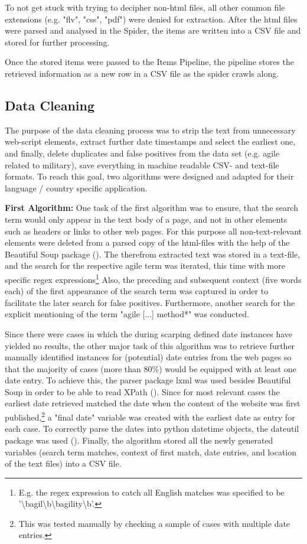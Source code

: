 \noindent
To not get stuck with trying to decipher non-html files, all other common file extensions (e.g. "flv", "css", "pdf") were denied for extraction. After the html files were parsed and analysed in the Spider, the items are written into a CSV file and stored for further processing.\par
\noindent
Once the stored items were passed to the Items Pipeline, the pipeline stores the retrieved information as a new row in a CSV file as the spider crawls along.\par 
%
\subsection{Data Cleaning}
The purpose of the data cleaning process was to strip the text from unnecessary web-script elements, extract further date timestamps and select the earliest one, and finally, delete duplicates and false positives from the data set (e.g. agile related to military), save everything in machine readable CSV- and text-file formats. To reach this goal, two algorithms were designed and adapted for their language / country specific application. \par 
\textbf{First Algorithm:} One task of the first algorithm was to ensure, that the search term would only appear in the text body of a page, and not in other elements such as headers or links to other web pages. For this purpose all non-text-relevant elements were deleted from a parsed copy of the html-files with the help of the Beautiful Soup package (\cite{Richardson2007}). The therefrom extracted text was stored in a text-file, and the search for the respective agile term was iterated, this time with more specific regex expressions\footnote{E.g. the regex expression to catch all English matches was specified to be '\textbackslash bagil\textbackslash b\textbar \textbackslash bagility\textbackslash b'.} Also, the preceding and subsequent context (five words each) of the first appearance of the search term was captured in order to facilitate the later search for false positives. Furthermore, another search for the explicit mentioning of the term "agile [...] method*" was conducted.\par 
Since there were cases in which the during scarping defined date instances have yielded no results, the other major task of this algorithm was to retrieve further manually identified instances for (potential) date entries from the web pages so that the majority of cases (more than 80\%) would be equipped with at least one date entry. To achieve this, the parser package lxml was used besides Beautiful Soup in order to be able to read XPath (\cite{Faassen2006, Clark1999}). Since for most relevant cases the earliest date retrieved matched the date when the content of the website was first published,\footnote{This was tested manually by checking a sample of cases with multiple date entries.} a "final date" variable was created with the earliest date as entry for each case. To correctly parse the dates into python datetime objects, the dateutil package was used (\cite{Niemeyer2003}). Finally, the algorithm stored all the newly generated variables (search term matches, context of first match, date entries, and location of the text files) into a CSV file.\par
